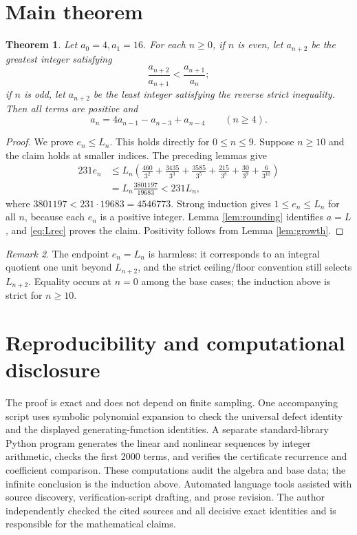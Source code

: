 \documentclass[11pt]{amsart}
\newtheorem{theorem}{Theorem}[section]
\theoremstyle{remark}
\newtheorem{remark}[theorem]{Remark}
\begin{document}
\section{Main theorem}
\begin{theorem}\label{thm:main}
Let $a_0=4,a_1=16$.  For each $n\ge0$, if $n$ is even, let $a_{n+2}$ be the
greatest integer satisfying
\[
 \frac{a_{n+2}}{a_{n+1}}<\frac{a_{n+1}}{a_n};
\]
if $n$ is odd, let $a_{n+2}$ be the least integer satisfying the reverse
strict inequality.  Then all terms are positive and
\[
 a_n=4a_{n-1}-a_{n-3}+a_{n-4}\qquad(n\ge4).
\]
\end{theorem}
\begin{proof}
We prove $e_n\le L_n$.  This holds directly for $0\le n\le9$.  Suppose
$n\ge10$ and the claim holds at smaller indices.  The preceding lemmas give
\[
\begin{split}
231e_n&\le L_n\left(\frac{460}{3^2}+\frac{3435}{3^3}
+\frac{3585}{3^5}+\frac{215}{3^8}+\frac{30}{3^9}+\frac6{3^{10}}\right)\\
&=L_n\frac{3801197}{19683}<231L_n,
\end{split}
\]
where $3801197<231\cdot19683=4546773$.  Strong induction gives
$1\le e_n\le L_n$ for all $n$, because each $e_n$ is a positive integer.
Lemma \ref{lem:rounding} identifies $a=L$, and \eqref{eq:Lrec} proves the
claim.  Positivity follows from Lemma \ref{lem:growth}.
\end{proof}

\begin{remark}
The endpoint $e_n=L_n$ is harmless: it corresponds to an integral quotient
one unit beyond $L_{n+2}$, and the strict ceiling/floor convention still
selects $L_{n+2}$.  Equality occurs at $n=0$ among the base cases; the
induction above is strict for $n\ge10$.
\end{remark}

\section*{Reproducibility and computational disclosure}
The proof is exact and does not depend on finite sampling.  One accompanying
script uses symbolic polynomial expansion to check the universal defect
identity and the displayed generating-function identities.  A separate
standard-library Python program generates the linear and nonlinear sequences
by integer arithmetic, checks the first 2000 terms, and verifies the
certificate recurrence and coefficient comparison.  These computations audit
the algebra and base data; the infinite conclusion is the induction above.
Automated language tools assisted with source discovery, verification-script
drafting, and prose revision.  The author independently checked the cited
sources and all decisive exact identities and is responsible for the
mathematical claims.



\end{document}
